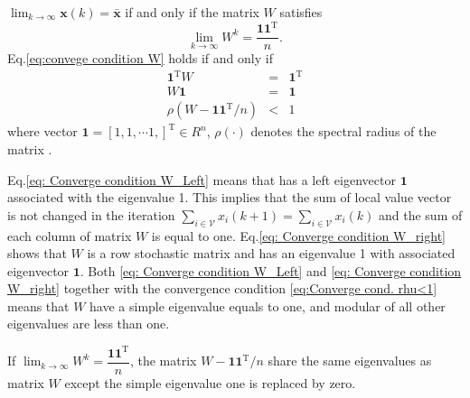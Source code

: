 \begin{thm}
\cite{Xiao2004}\textup{\label{thm:convergence condition}$\lim_{k\rightarrow\infty}\mathbf{x}(k)=\mathbf{\bar{x}}$}
if and only if the matrix $W$ satisfie\textup{s
\begin{equation}
\lim_{k\rightarrow\infty}W^{k}=\dfrac{\mathbf{11}^{\mathrm{T}}}{n}.\label{eq:convege condition W}
\end{equation}
}Eq.\eqref{eq:convege condition W} holds if and only if
\begin{eqnarray}
\mathbf{1}^{\mathrm{T}}W & = & \mathbf{1}^{\mathrm{T}}\label{eq: Converge condition W_Left}\\
W\mathbf{1} & = & \mathbf{1}\label{eq: Converge condition W_right}\\
\rho\left(W-\mathbf{11}^{\mathrm{T}}/n\right) & < & 1\label{eq:Converge cond. rhu<1}
\end{eqnarray}
where vector $\mathbf{1}=[1,1,\cdots1,]^{\mathrm{T}}\in R^{n}$, $\rho\left(\cdot\right)$
denotes the spectral radius of the matrix .
\end{thm}
Eq.\eqref{eq: Converge condition W_Left} means that has a left eigenvector
$\mathbf{1}$ associated with the eigenvalue 1. This implies that
the sum of local value vector is not changed in the iteration $\sum_{i\in\mathcal{V}}x_{i}\left(k+1\right)=\sum_{i\in\mathcal{V}}x_{i}\left(k\right)$
and the sum of each column of matrix $W$ is equal to one.
Eq.\eqref{eq: Converge condition W_right} shows that $W$
is a row stochastic matrix and has an eigenvalue 1 with associated
eigenvector $\mathbf{1}$. Both \eqref{eq: Converge condition W_Left}
and \eqref{eq: Converge condition W_right} together with the convergence
condition \eqref{eq:Converge cond. rhu<1} means that $W$
have a simple eigenvalue equals to one, and modular of all other eigenvalues
are less than one.
\begin{lem}
\textup{\label{thm:Share the eigenvalues}If $\lim_{k\rightarrow\infty}W^{k}=\dfrac{\mathbf{11}^{\mathrm{T}}}{n}$,
the matrix $W-\mathbf{11}^{\mathrm{T}}/n$ share the same
eigenvalues as matrix $W$ except the simple eigenvalue one
is replaced by zero.}\end{lem}
